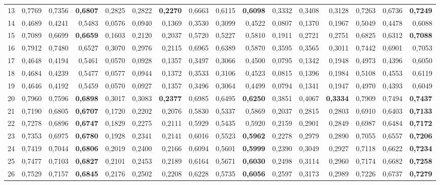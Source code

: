 \begin{table}[htp!]
\begin{adjustwidth}{-2cm}{}
\begin{tabular}{ l | *{15}{| r}}
13	&	0,7769	&	0,7356	&	\textbf{0,6807}	&	0,2825	&	0,2822	&	\textbf{0,2270}	&	0,6663	&	0,6115	&	\textbf{0,6098}	&	0,3332	&	0,3408	&	0,3128	&	0,7263	&	0,6736	&	\textbf{0,7249}	\\
14	&	0,4689	&	0,4241	&	0,5483	&	0,0576	&	0,0940	&	0,1369	&	0,3530	&	0,3099	&	0,4522	&	0,0807	&	0,1370	&	0,1967	&	0,5049	&	0,4478	&	0,6088	\\
15	&	0,7089	&	0,6699	&	\textbf{0,6659}	&	0,1603	&	0,2120	&	0,2037	&	0,5720	&	0,5227	&	0,5810	&	0,1911	&	0,2721	&	0,2751	&	0,6825	&	0,6312	&	\textbf{0,7088}	\\
16	&	0,7912	&	0,7480	&	0,6527	&	0,3070	&	0,2976	&	0,2115	&	0,6965	&	0,6389	&	0,5870	&	0,3595	&	0,3565	&	0,3011	&	0,7442	&	0,6901	&	0,7053	\\
17	&	0,4648	&	0,4194	&	0,5461	&	0,0570	&	0,0928	&	0,1357	&	0,3497	&	0,3066	&	0,4500	&	0,0795	&	0,1342	&	0,1948	&	0,4973	&	0,4396	&	0,6050	\\
18	&	0,4684	&	0,4239	&	0,5477	&	0,0577	&	0,0944	&	0,1372	&	0,3533	&	0,3106	&	0,4523	&	0,0815	&	0,1396	&	0,1984	&	0,5108	&	0,4553	&	0,6119	\\
19	&	0,4646	&	0,4192	&	0,5459	&	0,0570	&	0,0927	&	0,1357	&	0,3496	&	0,3064	&	0,4499	&	0,0794	&	0,1341	&	0,1947	&	0,4970	&	0,4393	&	0,6049	\\
20	&	0,7960	&	0,7596	&	\textbf{0,6898}	&	0,3017	&	0,3083	&	\textbf{0,2377}	&	0,6985	&	0,6495	&	\textbf{0,6250}	&	0,3851	&	0,4067	&	\textbf{0,3334}	&	0,7909	&	0,7494	&	\textbf{0,7437}	\\
21	&	0,7190	&	0,6805	&	\textbf{0,6707}	&	0,1720	&	0,2202	&	0,2076	&	0,5830	&	0,5337	&	0,5869	&	0,2037	&	0,2815	&	0,2803	&	0,6910	&	0,6403	&	\textbf{0,7133}	\\
22	&	0,7278	&	0,6896	&	\textbf{0,6747}	&	0,1829	&	0,2275	&	0,2111	&	0,5929	&	0,5435	&	0,5920	&	0,2159	&	0,2901	&	0,2849	&	0,6987	&	0,6484	&	\textbf{0,7172}	\\
23	&	0,7353	&	0,6975	&	\textbf{0,6780}	&	0,1928	&	0,2341	&	0,2141	&	0,6016	&	0,5523	&	\textbf{0,5962}	&	0,2278	&	0,2979	&	0,2890	&	0,7055	&	0,6557	&	\textbf{0,7206}	\\
24	&	0,7419	&	0,7044	&	\textbf{0,6806}	&	0,2019	&	0,2400	&	0,2166	&	0,6094	&	0,5601	&	\textbf{0,5999}	&	0,2390	&	0,3049	&	0,2927	&	0,7118	&	0,6622	&	\textbf{0,7234}	\\
25	&	0,7477	&	0,7103	&	\textbf{0,6827}	&	0,2101	&	0,2453	&	0,2189	&	0,6164	&	0,5671	&	\textbf{0,6030}	&	0,2498	&	0,3114	&	0,2960	&	0,7174	&	0,6682	&	\textbf{0,7258}	\\
26	&	0,7529	&	0,7157	&	\textbf{0,6845}	&	0,2176	&	0,2502	&	0,2208	&	0,6228	&	0,5735	&	\textbf{0,6056}	&	0,2597	&	0,3173	&	0,2989	&	0,7226	&	0,6737	&	\textbf{0,7279}	\\

\end{tabular}
\end{adjustwidth}
\end{table}
